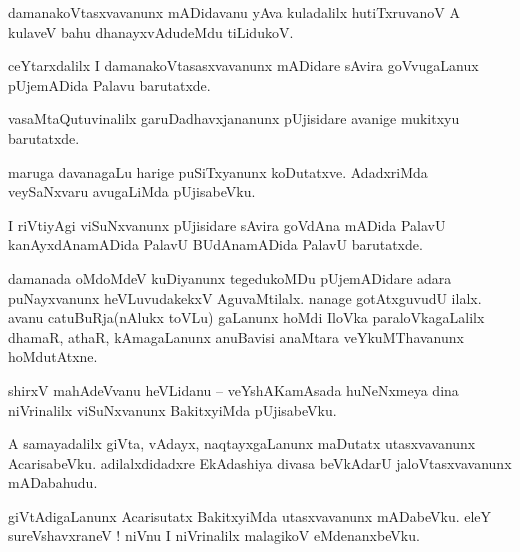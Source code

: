 \documentclass{article}
\begin{document}
\begin{mn}%
damanakoVtasxvavanunx mADidavanu yAva kuladalilx hutiTxruvanoV A kulaveV bahu dhanayxvAdudeMdu 
tiLidukoV.
\end{mn}

\begin{mn}%
ceYtarxdalilx I damanakoVtasasxvavanunx mADidare sAvira goVvugaLanux pUjemADida Palavu barutatxde.
\end{mn}

\begin{mn}%
vasaMtaQutuvinalilx garuDadhavxjananunx pUjisidare avanige mukitxyu barutatxde.
\end{mn}

\begin{mn}%
maruga davanagaLu harige puSiTxyanunx koDutatxve. AdadxriMda veySaNxvaru avugaLiMda pUjisabeVku.
\end{mn}

\begin{mn}%
I riVtiyAgi viSuNxvanunx pUjisidare sAvira goVdAna mADida PalavU kanAyxdAnamADida PalavU 
BUdAnamADida PalavU barutatxde.
\end{mn}

\begin{mn}%
damanada oMdoMdeV kuDiyanunx tegedukoMDu pUjemADidare adara puNayxvanunx heVLuvudakekxV 
AguvaMtilalx. nanage gotAtxguvudU ilalx. avanu catuBuRja(nAlukx toVLu) gaLanunx hoMdi IloVka 
paraloVkagaLalilx dhamaR, athaR, kAmagaLanunx anuBavisi anaMtara veYkuMThavanunx hoMdutAtxne.
\end{mn}


\begin{mn}%
shirxV mahAdeVvanu heVLidanu -- veYshAKamAsada huNeNxmeya dina niVrinalilx viSuNxvanunx BakitxyiMda 
pUjisabeVku.
\end{mn}

\begin{mn}%
A samayadalilx giVta, vAdayx, naqtayxgaLanunx maDutatx utasxvavanunx AcarisabeVku. adilalxdidadxre 
EkAdashiya divasa beVkAdarU jaloVtasxvavanunx mADabahudu.
\end{mn}

\begin{mn}%
giVtAdigaLanunx Acarisutatx BakitxyiMda utasxvavanunx mADabeVku. eleY sureVshavxraneV ! niVnu I 
niVrinalilx malagikoV eMdenanxbeVku.
\end{mn}
\end{document}
